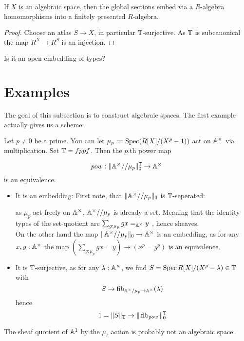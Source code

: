 \begin{lemma}
	If $X$ is an algebraic space, then the global sections embed via a $R$-algebra homomorphisms into a finitely presented $R$-algebra.
\end{lemma}
\begin{proof}
	Choose an atlas $S \to X$, in particular $\mathbb{T}$-surjective. As $\mathbb{T}$ is subcanonical the map $R^X \to R^S$ is an injection.
\end{proof}
\begin{question}
	Is it an open embedding of types?
\end{question}
\section{Examples}
The goal of this subsection is to construct algebraic spaces. The first example actually gives us a scheme:
\begin{example}
	Let $p \neq 0$ be a prime. You can let $\mu_p := \operatorname{Spec}(R[X] / (X^p - 1))$ act on $\mathbb{A}^\times$ via multiplication. Set $\mathbb{T}= fppf$. Then the $p$.th power map
	
	\[
	pow : \| \mathbb{A}^\times // \mu_p \|_0^{\mathbb{T}} \to \mathbb{A}^\times
	\]
	is an equivalence.
	\begin{itemize}
		\item 	 It is an embedding: 
		First note, that $\|\mathbb{A}^\times // \mu_p \|_0$ is $\mathbb{T}$-seperated:
		
		as $\mu_p$ act freely on $\mathbb{A}^\times$, $\mathbb{A}^\times // \mu_p$ is already a set. Meaning that the identity types of the set-quotient are $\sum_{g: \mu_p} g x =_{\mathbb{A}^\times} y$ , hence sheaves. \\
		On the other hand the map $\|\mathbb{A}^\times // \mu_p \|_0 \to \mathbb{A}^\times$ is an embedding, as for any $x , y : \mathbb{A}^\times$ the map $(\sum_{g : \mu_p} g x = y) \to (x^p = y^p)$ is an equivalence. 
		\item 	It is $\mathbb{T}$-surjective, as for any $\lambda : \mathbb{A}^\times$, we find $S = \operatorname{Spec} R [X] / (X^p - \lambda) \in \mathbb{T}$ with 
		\[
		S \to \operatorname{fib}_{\mathbb{A}^\times / \mu_p \to \mathbb{A}^\times}(\lambda)
		\]
		hence 
		\[
		1 = \|S\|_{\mathbb{T}} \to \|\operatorname{fib}_{pow}\|_0^{\mathbb{T}}
		\]
	\end{itemize}
	
	
\end{example}
\begin{example}[TODO]
	The sheaf quotient of $\mathbb{A}^1$ by the $\mu_\ell$ action is probably not an algebraic space.
\end{example}
